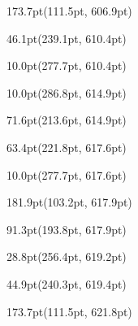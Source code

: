 \documentclass{article}
\begin{document}
\begin{textblock*}{173.7pt}(111.5pt, 606.9pt)%
\noindent%
%
\end{textblock*}
\begin{textblock*}{46.1pt}(239.1pt, 610.4pt)%
\noindent%
%
\end{textblock*}
\begin{textblock*}{10.0pt}(277.7pt, 610.4pt)%
\noindent%
%
\end{textblock*}
\begin{textblock*}{10.0pt}(286.8pt, 614.9pt)%
\noindent%
%
\end{textblock*}
\begin{textblock*}{71.6pt}(213.6pt, 614.9pt)%
\noindent%
%
\end{textblock*}
\begin{textblock*}{63.4pt}(221.8pt, 617.6pt)%
\noindent%
%
\end{textblock*}
\begin{textblock*}{10.0pt}(277.7pt, 617.6pt)%
\noindent%
%
\end{textblock*}
\begin{textblock*}{181.9pt}(103.2pt, 617.9pt)%
\noindent%
%
\end{textblock*}
\begin{textblock*}{91.3pt}(193.8pt, 617.9pt)%
\noindent%
%
\end{textblock*}
\begin{textblock*}{28.8pt}(256.4pt, 619.2pt)%
\noindent%
%
\end{textblock*}
\begin{textblock*}{44.9pt}(240.3pt, 619.4pt)%
\noindent%
%
\end{textblock*}
\begin{textblock*}{173.7pt}(111.5pt, 621.8pt)%
\noindent%
%
\end{textblock*}
\end{document}
